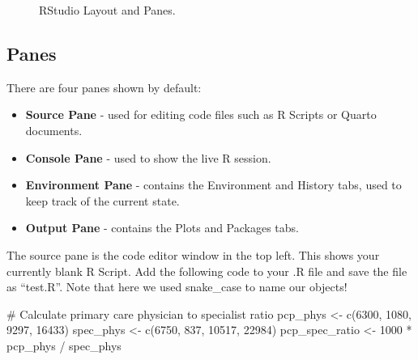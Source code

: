 \documentclass[
  letterpaper,
]{latex/krantz}
\makeatletter
\newenvironment{Shaded}{\begin{snugshade}}{\end{snugshade}}
\newcommand{\CommentTok}[1]{\textcolor[rgb]{0.37,0.37,0.37}{#1}}
\newcommand{\DecValTok}[1]{\textcolor[rgb]{0.68,0.00,0.00}{#1}}
\newcommand{\FunctionTok}[1]{\textcolor[rgb]{0.28,0.35,0.67}{#1}}
\newcommand{\NormalTok}[1]{\textcolor[rgb]{0.00,0.23,0.31}{#1}}
\newcommand{\OtherTok}[1]{\textcolor[rgb]{0.00,0.23,0.31}{#1}}
\newcommand{\SpecialCharTok}[1]{\textcolor[rgb]{0.37,0.37,0.37}{#1}}
\newenvironment{kframe}{%
\medskip{}
\setlength{\fboxsep}{.8em}
 \def\at@end@of@kframe{}%
 \ifinner\ifhmode%
  \def\at@end@of@kframe{\end{minipage}}%
  \begin{minipage}{\columnwidth}%
 \fi\fi%
 \def\FrameCommand##1{\hskip\@totalleftmargin \hskip-\fboxsep
 \colorbox{shadecolor}{##1}\hskip-\fboxsep
     \hskip-\linewidth \hskip-\@totalleftmargin \hskip\columnwidth}%
 \MakeFramed {\advance\hsize-\width
   \@totalleftmargin\z@ \linewidth\hsize
   \@setminipage}}%
 {\par\unskip\endMakeFramed%
 \at@end@of@kframe}
\renewenvironment{Shaded}{\begin{kframe}}{\end{kframe}}
\makeatother
\begin{document}
\begin{figure}


\caption{\label{fig-rstudio}RStudio Layout and Panes.}

\end{figure}%

\subsection{Panes}\label{panes}

There are four panes shown by default:

\begin{itemize}
\item
  \textbf{Source Pane} - used for editing code files such as R Scripts
  or Quarto documents.
\item
  \textbf{Console Pane} - used to show the live R session.
\item
  \textbf{Environment Pane} - contains the Environment and History tabs,
  used to keep track of the current state.
\item
  \textbf{Output Pane} - contains the Plots and Packages tabs.
\end{itemize}

The source pane is the code editor window in the top left. This shows
your currently blank R Script. Add the following code to your .R file
and save the file as ``test.R''. Note that here we used snake\_case to
name our objects!

\begin{Shaded}
\begin{Highlighting}[]
\CommentTok{\# Calculate primary care physician to specialist ratio}
\NormalTok{pcp\_phys }\OtherTok{\textless{}{-}} \FunctionTok{c}\NormalTok{(}\DecValTok{6300}\NormalTok{, }\DecValTok{1080}\NormalTok{, }\DecValTok{9297}\NormalTok{, }\DecValTok{16433}\NormalTok{)}
\NormalTok{spec\_phys }\OtherTok{\textless{}{-}} \FunctionTok{c}\NormalTok{(}\DecValTok{6750}\NormalTok{, }\DecValTok{837}\NormalTok{, }\DecValTok{10517}\NormalTok{, }\DecValTok{22984}\NormalTok{)}
\NormalTok{pcp\_spec\_ratio }\OtherTok{\textless{}{-}} \DecValTok{1000} \SpecialCharTok{*}\NormalTok{ pcp\_phys }\SpecialCharTok{/}\NormalTok{ spec\_phys}
\end{Highlighting}
\end{Shaded}
\end{document}
